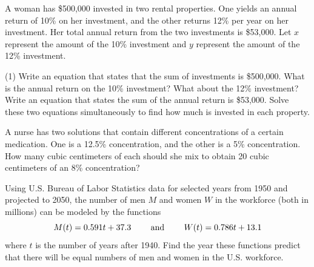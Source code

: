 \documentclass[../mathNotesPreamble]{subfiles}
\begin{document}
  \begin{ex*}
    A woman has \$500,000 invested in two rental properties. One yields an annual return of 10\% on her investment, and the other returns 12\% per year on her investment. Her total annual return from the two investments is \$53,000. Let $x$ represent the amount of the 10\% investment and $y$ represent the amount of the 12\% investment.
  \end{ex*}
  \begin{tasks}[after-item-skip=2.5\baselineskip, label=\textbullet](1)
    \task Write an equation that states that the sum of investments is \$500,000.
    \task What is the annual return on the 10\% investment? What about the 12\% investment?
    \task Write an equation that states the sum of the annual return is \$53,000.
    \task Solve these two equations simultaneously to find how much is invested in each property.
  \end{tasks}
  \pagebreak

  \begin{ex*}
    A nurse has two solutions that contain different concentrations of a certain medication. One is a 12.5\% concentration, and the other is a 5\% concentration. How many cubic centimeters of each should she mix to obtain 20 cubic centimeters of an 8\% concentration?
  \end{ex*}
  \pagebreak

  \begin{ex*}
    Using U.S. Bureau of Labor Statistics data for selected years from 1950 and projected to 2050, the number of men $M$ and women $W$ in the workforce (both in millions) can be modeled by the functions
      \[M(t)=0.591t+37.3 \hspace*{20pt}\textnormal{ and }\hspace*{20pt} W(t)=0.786t+13.1\]
    where $t$ is the number of years after 1940. Find the year these functions predict that there will be equal numbers of men and women in the U.S. workforce.
  \end{ex*}
  \begin{flushright}
  \end{flushright}

  \pagebreak
\end{document}
